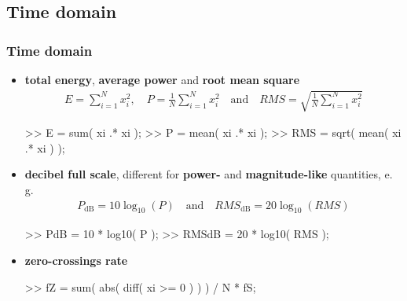 
\subsection{Time domain}

\begin{frame}[fragile]
	\frametitle{Time domain}
	\begin{itemize}
		\item \textbf{total energy}, \textbf{average power} and \textbf{root mean square}
			\begin{align*}
				E=\sum_{i=1}^Nx_i^2,\quad P=\frac1N\sum_{i=1}^Nx_i^2\quad\textrm{and}\quad\mathit{RMS}=\sqrt{\frac1N\sum_{i=1}^Nx_i^2}
			\end{align*}
			\begin{code}
>> E = sum( xi .* xi ); \color{medium}%
>> P = mean( xi .* xi ); \color{medium}%
>> RMS = sqrt( mean( xi .* xi ) ); \color{medium}%
			\end{code}
		\item \textbf{decibel full scale}, different for \textbf{power-} and \textbf{magnitude-like} quantities, e.\,g.
			\begin{align*}
				P_{\textrm{dB}}=10\log_{10}(P)\quad\textrm{and}\quad\mathit{RMS}_{\textrm{dB}}=20\log_{10}(\mathit{RMS})
			\end{align*}
			\begin{code}
>> PdB = 10 * log10( P ); \color{medium}%
>> RMSdB = 20 * log10( RMS ); \color{medium}%
			\end{code}
		\item \textbf{zero-crossings rate}
			\begin{code}
>> fZ = sum( abs( diff( xi >= 0 ) ) ) / N * fS;
			\end{code}
	\end{itemize}
\end{frame}

